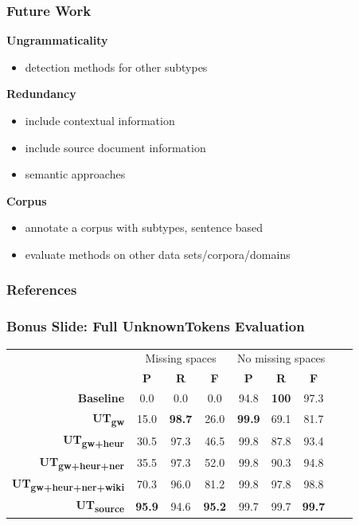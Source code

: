 \documentclass[table]{beamer}
\begin{document}
\begin{frame}
  \frametitle{Future Work}
  \textbf{Ungrammaticality}
  \begin{itemize}
    \item detection methods for other subtypes
  \end{itemize}\pause
  \vspace{0.5cm}
  \textbf{Redundancy}
  \begin{itemize}
    \item include contextual information
    \item include source document information
    \item semantic approaches
  \end{itemize}\pause
  \vspace{0.5cm}
  \textbf{Corpus}
  \begin{itemize}
    \item annotate a corpus with subtypes, sentence based
    \item evaluate methods on other data sets/corpora/domains
  \end{itemize}
\end{frame}

\begin{frame}
  \frametitle{References}
  
  \footnotesize
\end{frame}

\begin{frame}
  \frametitle{Bonus Slide: Full \textbf{UnknownTokens} Evaluation}
  \begin{tabular}{r|c|c|c|c|c|c|c|c|}
  & \multicolumn{3}{c|}{Missing spaces} & \multicolumn{3}{c|}{No missing spaces}\\
  & \textbf{P} & \textbf{R} & \textbf{F} & \textbf{P} & \textbf{R} & \textbf{F}\\
  \hline
  \textbf{Baseline} & 0.0 & 0.0 & 0.0 & 94.8 & \textbf{100} & 97.3\\
  \hline\hline
  \textbf{UT\textsubscript{gw}} & 15.0 & \textbf{98.7} & 26.0 & \textbf{99.9} & 69.1 & 81.7\\
  \hline
  \textbf{UT\textsubscript{gw+heur}} & 30.5 & 97.3 & 46.5 & 99.8 & 87.8 & 93.4\\
  \hline
  \textbf{UT\textsubscript{gw+heur+ner}} & 35.5 & 97.3 & 52.0 & 99.8 & 90.3 & 94.8\\
  \hline
  \textbf{UT\textsubscript{gw+heur+ner+wiki}} & 70.3 & 96.0 & 81.2 & 99.8 & 97.8 & 98.8\\
  \hline\hline
  \textbf{UT\textsubscript{source}} & \textbf{95.9} & 94.6 & \textbf{95.2} & 99.7 & 99.7 & \textbf{99.7}\\
  \hline
  \end{tabular}
\end{frame}
\end{document}
